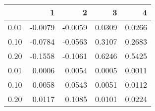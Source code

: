 \begin{tabular}{lrrrr}
\toprule
{} &       1 &       2 &       3 &       4 \\
\midrule
0.01 & -0.0079 & -0.0059 &  0.0309 &  0.0266 \\
0.10 & -0.0784 & -0.0563 &  0.3107 &  0.2683 \\
0.20 & -0.1558 & -0.1061 &  0.6246 &  0.5425 \\
0.01 &  0.0006 &  0.0054 &  0.0005 &  0.0011 \\
0.10 &  0.0058 &  0.0543 &  0.0051 &  0.0112 \\
0.20 &  0.0117 &  0.1085 &  0.0101 &  0.0224 \\
\bottomrule
\end{tabular}
